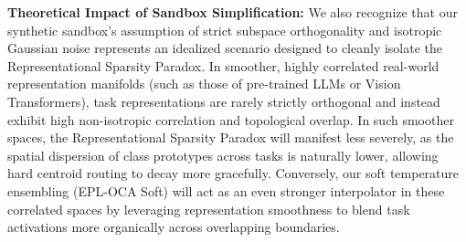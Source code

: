 \textbf{Theoretical Impact of Sandbox Simplification:} We also recognize that our synthetic sandbox's assumption of strict subspace orthogonality and isotropic Gaussian noise represents an idealized scenario designed to cleanly isolate the Representational Sparsity Paradox. In smoother, highly correlated real-world representation manifolds (such as those of pre-trained LLMs or Vision Transformers), task representations are rarely strictly orthogonal and instead exhibit high non-isotropic correlation and topological overlap. In such smoother spaces, the Representational Sparsity Paradox will manifest less severely, as the spatial dispersion of class prototypes across tasks is naturally lower, allowing hard centroid routing to decay more gracefully. Conversely, our soft temperature ensembling (EPL-OCA Soft) will act as an even stronger interpolator in these correlated spaces by leveraging representation smoothness to blend task activations more organically across overlapping boundaries.

